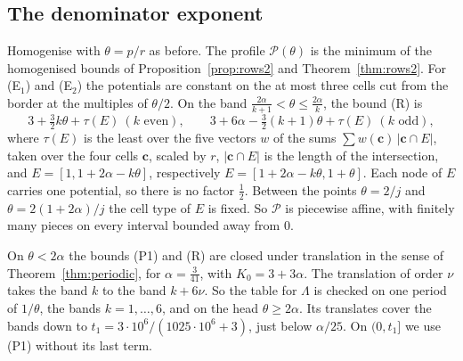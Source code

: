 \documentclass[11pt]{amsart}
\theoremstyle{definition}
\theoremstyle{remark}
\numberwithin{equation}{section}
\begin{document}
\subsection{The denominator exponent}
Homogenise with $\theta=p/r$ as before. The profile $\mathcal P(\theta)$ is the minimum of the homogenised bounds of
Proposition~\ref{prop:rows2} and Theorem~\ref{thm:rows2}. For (E$_1$) and (E$_2$) the potentials are constant on the at
most three cells cut from the border at the multiples of $\theta/2$. On the band
$\frac{2\alpha}{k+1}<\theta\le\frac{2\alpha}k$, the bound (R) is
\[
 3+\tfrac32k\theta+\tau(E)\ (k\text{ even}),\qquad 3+6\alpha-\tfrac32(k+1)\theta+\tau(E)\
 (k\text{ odd}),
\]
where $\tau(E)$ is the least over the five vectors $w$ of the sums
$\sum w(\mathbf c)\,|\mathbf c\cap E|$, taken over the four cells $\mathbf c$, scaled
by $r$, $|\mathbf c\cap E|$ is the length of the intersection, and $E=[1,1+2\alpha-k\theta]$,
respectively $E=[1+2\alpha-k\theta,1+\theta]$. Each node of $E$ carries one potential, so there is no
factor $\frac12$. Between the points $\theta=2/j$ and $\theta=2(1+2\alpha)/j$ the cell type of $E$ is fixed. So
$\mathcal P$ is piecewise affine, with finitely many pieces on every interval bounded away from $0$.

On $\theta<2\alpha$ the bounds (P1) and (R) are closed under translation in the sense of Theorem~\ref{thm:periodic},
for $\alpha=\frac3{41}$, with $K_0=3+3\alpha$. The translation of order $\nu$ takes the band $k$ to the band
$k+6\nu$. So the table for $\Lambda$ is checked on one period of $1/\theta$, the bands $k=1,\dots,6$, and on the head
$\theta\ge2\alpha$. Its translates cover the bands down to $t_1=3\cdot10^6/(1025\cdot10^6+3)$, just below
$\alpha/25$. On $(0,t_1]$ we use (P1) without its last term.
\end{document}
